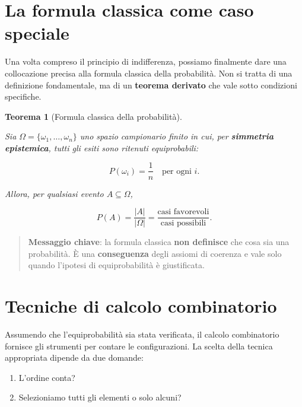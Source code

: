 \documentclass[
  italian,
  letterpaper,
  a4paper,
  11pt,
  open=any]{scrbook}
\providecommand{\tightlist}{%
  \setlength{\itemsep}{0pt}\setlength{\parskip}{0pt}}
\theoremstyle{plain}
\newtheorem{theorem}{Teorema}[chapter]
\theoremstyle{definition}
\theoremstyle{definition}
\theoremstyle{remark}
\begin{document}
\section{La formula classica come caso
speciale}\label{sec-classical-formula}

Una volta compreso il principio di indifferenza, possiamo finalmente
dare una collocazione precisa alla formula classica della probabilità.
Non si tratta di una definizione fondamentale, ma di un \textbf{teorema
derivato} che vale sotto condizioni specifiche.

\begin{theorem}[Formula classica della
probabilità]\protect\hypertarget{thm-classical-formula}{}\label{thm-classical-formula}

Sia \(\Omega = \{\omega_1, \ldots, \omega_n\}\) uno spazio campionario
finito in cui, per \textbf{simmetria epistemica}, tutti gli esiti sono
ritenuti equiprobabili:

\[
P(\omega_i) = \frac{1}{n} \quad \text{per ogni } i.
\]

Allora, per qualsiasi evento \(A \subseteq \Omega\),

\[
P(A) = \frac{|A|}{|\Omega|}
= \frac{\text{casi favorevoli}}{\text{casi possibili}}.
\]

\end{theorem}

\begin{quote}
\textbf{Messaggio chiave}: la formula classica \textbf{non definisce}
che cosa sia una probabilità. È una \textbf{conseguenza} degli assiomi
di coerenza e vale solo quando l'ipotesi di equiprobabilità è
giustificata.
\end{quote}

\section{Tecniche di calcolo combinatorio}\label{sec-combinatorics}

Assumendo che l'equiprobabilità sia stata verificata, il calcolo
combinatorio fornisce gli strumenti per contare le configurazioni. La
scelta della tecnica appropriata dipende da due domande:

\begin{enumerate}
\def\labelenumi{\arabic{enumi}.}
\tightlist
\item
  L'ordine conta?
\item
  Selezioniamo tutti gli elementi o solo alcuni?
\end{enumerate}
\end{document}
